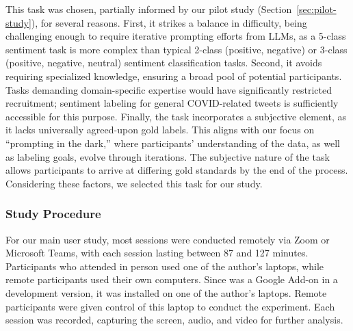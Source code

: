 This task was chosen, partially informed by our pilot study (Section~\ref{sec:pilot-study}), for several reasons. 
First, it strikes a balance in difficulty, being challenging enough to require iterative prompting efforts from LLMs, as a 5-class sentiment task is more complex than typical 2-class (positive, negative) or 3-class (positive, negative, neutral) sentiment classification tasks. 
Second, it avoids requiring specialized knowledge, ensuring a broad pool of potential participants. 
Tasks demanding domain-specific expertise would have significantly restricted recruitment; sentiment labeling for general COVID-related tweets is sufficiently accessible for this purpose. 
Finally, the task incorporates a subjective element, as it lacks universally agreed-upon gold labels. 
This aligns with our focus on ``prompting in the dark,'' where participants' understanding of the data, as well as labeling goals, evolve through iterations.
The subjective nature of the task allows participants to arrive at differing gold standards by the end of the process.
Considering these factors, we selected this task for our study.









\subsubsection{Study Procedure\label{sec:study-procedure}}
For our main user study, most sessions were conducted remotely via Zoom or Microsoft Teams, with each session lasting between 87 and 127 minutes. 
Participants who attended in person used one of the author's laptops, while remote participants used their own computers. 
Since \system was a Google Add-on in a development version, it was installed on one of the author's laptops. 
Remote participants were given control of this laptop to conduct the experiment. 
Each session was recorded, capturing the screen, audio, and video for further analysis.

